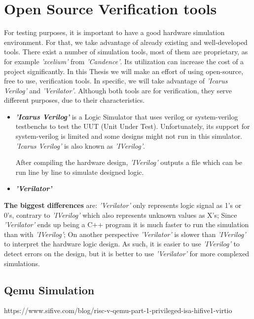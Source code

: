 \section{Open Source Verification tools}
For testing purposes, it is important to have a good hardware simulation environment. For that, we take advantage of already existing and well-developed tools. There exist a number of simulation tools, most of them are proprietary, as for example \textit{'xcelium'} from \textit{'Candence'}. Its utilization can increase the cost of a project significantly. In this Thesis we will make an effort of using open-source, free to use, verification tools. In specific, we will take advantage of \textit{'Icarus Verilog'} and \textit{'Verilator'}. Although both tools are for verification, they serve different purposes, due to their characteristics.

\begin{itemize}
    \item \textbf{\textit{'Icarus Verilog'}} is a Logic Simulator that uses verilog or system-verilog testbenchs to test the UUT (Unit Under Test). Unfortunately, its support for system-verilog is limited and some designs might not run in this simulator. \textit{'Icarus Verilog'} is also known as \textit{'IVerilog'}.
    
    After compiling the hardware design, \textit{'IVerilog'} outputs a file which can be run line by line to simulate designed logic.
    
    \item \textbf{\textit{'Verilator'}}
\end{itemize}

\textbf{The biggest differences} are: \textit{'Verilator'} only represents logic signal as 1's or 0's, contrary to \textit{'IVerilog'} which also represents unknown values as X's; Since \textit{'Verilator'} ends up being a C++ program it is much faster to run the simulation than with \textit{'IVerilog'}; On another perspective \textit{'Verilator'} is slower than \textit{'IVerilog'} to interpret the hardware logic design.
As such, it is easier to use \textit{'IVerilog'} to detect errors on the design, but it is better to use \textit{'Verilator'} for more complexed simulations.

\subsection{Qemu Simulation}
https://www.sifive.com/blog/risc-v-qemu-part-1-privileged-isa-hifive1-virtio


